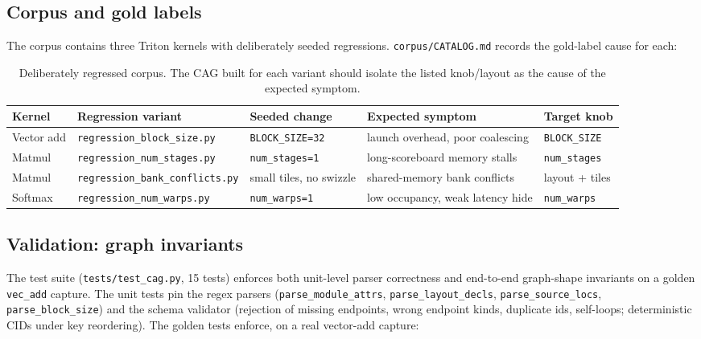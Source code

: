 \documentclass[10pt]{article}
\begin{document}
\subsection{Corpus and gold labels}\label{sec:corpus}

The corpus contains three Triton kernels with deliberately seeded regressions. \texttt{corpus/CATALOG.md} records the gold-label cause for each:

\begin{table}[h]
\centering\footnotesize
\setlength{\tabcolsep}{4pt}
\begin{tabular}{@{}lllll@{}}
\toprule
\textbf{Kernel} & \textbf{Regression variant} & \textbf{Seeded change} & \textbf{Expected symptom} & \textbf{Target knob} \\ \midrule
Vector add & \texttt{regression\_block\_size.py}      & \texttt{BLOCK\_SIZE=32}   & launch overhead, poor coalescing & \texttt{BLOCK\_SIZE} \\
Matmul     & \texttt{regression\_num\_stages.py}      & \texttt{num\_stages=1}    & long-scoreboard memory stalls    & \texttt{num\_stages} \\
Matmul     & \texttt{regression\_bank\_conflicts.py}  & small tiles, no swizzle   & shared-memory bank conflicts     & layout + tiles \\
Softmax    & \texttt{regression\_num\_warps.py}       & \texttt{num\_warps=1}     & low occupancy, weak latency hide & \texttt{num\_warps} \\
\bottomrule
\end{tabular}
\caption{Deliberately regressed corpus. The CAG built for each variant should isolate the listed knob/layout as the cause of the expected symptom.}
\label{tab:corpus}
\end{table}

\subsection{Validation: graph invariants}\label{sec:tests}

The test suite (\texttt{tests/test\_cag.py}, 15 tests) enforces both unit-level parser correctness and end-to-end graph-shape invariants on a golden \texttt{vec\_add} capture. The unit tests pin the regex parsers (\texttt{parse\_module\_attrs}, \texttt{parse\_layout\_decls}, \texttt{parse\_source\_locs}, \texttt{parse\_block\_size}) and the schema validator (rejection of missing endpoints, wrong endpoint kinds, duplicate ids, self-loops; deterministic CIDs under key reordering). The golden tests enforce, on a real vector-add capture:
\end{document}

